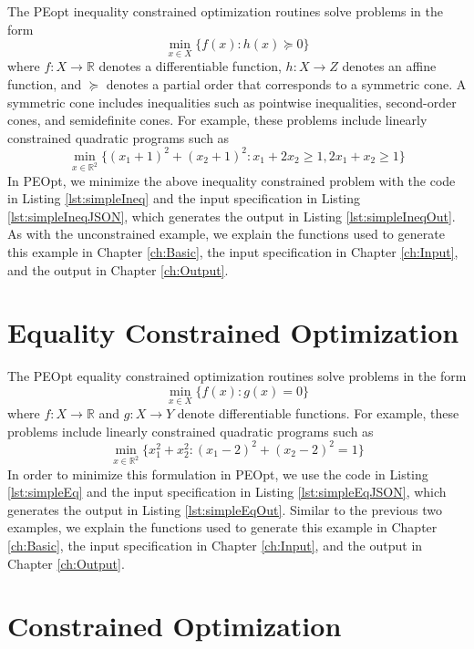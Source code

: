 \documentclass{report}
\newcommand{\re}{\mathbb{R}}
\begin{document}
        The PEopt inequality constrained optimization routines solve problems in the form
$$
        \min_{x\in X} \{ f(x) : h(x)\succeq 0\}
$$
where $f:X\rightarrow \re$ denotes a differentiable function, $h:X\rightarrow Z$ denotes an affine function, and $\succeq$ denotes a partial order that corresponds to a symmetric cone.  A symmetric cone includes inequalities such as pointwise inequalities, second-order cones, and semidefinite cones.  For example, these problems include linearly constrained quadratic programs such as
$$
        \min_{x\in\re^2}\{(x_1+1)^2+(x_2+1)^2 : x_1 + 2x_2 \geq 1, 2x_1 + x_2\geq 1\}
$$
In PEOpt, we minimize the above inequality constrained problem with the code in Listing \ref{lst:simpleIneq} and the input specification in Listing \ref{lst:simpleIneqJSON}, which generates the output in Listing \ref{lst:simpleIneqOut}.  As with the unconstrained example, we explain the functions used to generate this example in Chapter \ref{ch:Basic}, the input specification in Chapter \ref{ch:Input}, and the output in Chapter \ref{ch:Output}.





\section{Equality Constrained Optimization}

        The PEOpt equality constrained optimization routines solve problems in the form
$$
        \min_{x\in X} \{ f(x) : g(x)=0 \}
$$
where $f:X\rightarrow \re$ and $g:X\rightarrow Y$ denote differentiable functions.  For example, these problems include linearly constrained quadratic programs such as
$$
        \min_{x\in\re^2}\{x_1^2+x_2^2 : (x_1-2)^2 + (x_2-2)^2 = 1 \}
$$
In order to minimize this formulation in PEOpt, we use the code in Listing \ref{lst:simpleEq} and the input specification in Listing \ref{lst:simpleEqJSON}, which generates the output in Listing \ref{lst:simpleEqOut}.  Similar to the previous two examples, we explain the functions used to generate this example in Chapter \ref{ch:Basic}, the input specification in Chapter \ref{ch:Input}, and the output in Chapter \ref{ch:Output}.





\section{Constrained Optimization}
\end{document}
